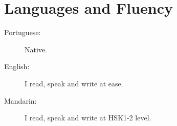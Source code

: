 \documentclass[letterpaper]{../cls/twentysecondcvenglish} %
\makeatletter
\def\py@yunpriv#1{%
  \if a#1 10\else
  \if o#1 9\else
  \if e#1 8\else
  \if i#1 7\else
  \if u#1 6\else
  \if v#1 5\else
  \if A#1 4\else
  \if O#1 3\else
  \if E#1 2\fi\fi\fi\fi\fi\fi\fi\fi\fi0
}
\def\py@init{%
  \edef\py@befirst{}%
  \edef\py@char{}\edef\py@tuneletter{}%
  \def\py@last{}%
  \def\py@tune{5}%
}
\def\pinyin#1{%
  \edef\py@postscan{#1}%
  \py@init
  \loop
  \edef\py@char{\expandafter\@car\py@postscan\@nil}%
  \edef\py@postscan{\expandafter\@cdr\py@postscan\@nil}%
  \ifnum 0 < 0\py@char
    \edef\py@tune{\py@char}%
    \py@first \py@tuneat\py@tuneletter\py@tune \py@last\kern -4sp\kern 4sp{}\py@init
  \else
    \ifnum\py@yunpriv\py@char > \py@yunpriv\py@tuneletter
      \edef\py@tuneletter{\py@char}\edef\py@first{\py@befirst}\def\py@last{}%
    \else
      \edef\py@last{\py@last\if v\py@char\"u\else\py@char\fi}%
    \fi
    \edef\py@befirst{\py@befirst\if v\py@char\"u\else\py@char\fi}%
  \fi
  \ifx\py@postscan\@empty\else
  \repeat
}
\let\py@macron \=
\let\py@acute \'
\let\py@hacek \v
\let\py@grave \`
\def\py@tuneat#1#2{%
  \if v#1%
    \py@tune@v #2%
  \else
  \if i#1%
    \py@tune@i #2%
  \else
    \ifcase#2%
      \or\py@macron #1\or\py@acute #1\or\py@hacek #1\or\py@grave #1\else #1%
    \fi
  \fi\fi
}
\def\py@tune@v#1{{%
    \dimen@ii 1ex%
    \fontdimen5\font 1.1ex%
    \rlap{\"u}%
    \fontdimen5\font .6ex%
    \ifcase#1%
      \or\py@macron u\or\py@acute u\or\py@hacek u\or\py@grave u\else u%
    \fi
    \fontdimen5\font\dimen@ii
  }}
\def\py@tune@i#1{%
  \ifcase#1
    \or\py@macron \i\or\py@acute \i\or\py@hacek \i\or\py@grave \i\else i%
  \fi
}
\makeatother
\begin{document}
\vspace{0.2cm}
\section{Languages and Fluency}

\begin{description}
\item[Portuguese:] Native.
\item[English:] I read, speak and write at ease.
\item[Mandarin:] I read, speak and write at HSK1-2 level.

\end{description}

\vspace{0.2cm}




\end{document}
